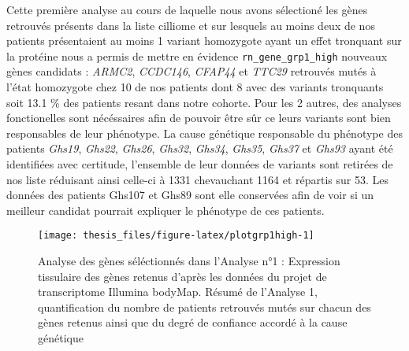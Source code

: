 \documentclass[12pt,twoside]{reedthesis}
\theoremstyle{definition}
\theoremstyle{definition}
\theoremstyle{remark}
\begin{document}
  Cette première analyse au cours de laquelle nous avons sélectioné les
  gènes retrouvés présents dans la liste cilliome et sur lesquels au moins
  deux de nos patients présentaient au moins 1 variant homozygote ayant un
  effet tronquant sur la protéine nous a permis de mettre en évidence
  \texttt{rn\_gene\_grp1\_high} nouveaux gènes candidats : \emph{ARMC2},
  \emph{CCDC146}, \emph{CFAP44} et \emph{TTC29} retrouvés mutés à l'état
  homozygote chez 10 de nos patients dont 8 avec des variants tronquants
  soit 13.1 \% des patients resant dans notre cohorte. Pour les 2 autres,
  des analyses fonctionelles sont nécéssaires afin de pouvoir être sûr ce
  leurs variants sont bien responsables de leur phénotype. La cause
  génétique responsable du phénotype des patients \emph{Ghs19},
  \emph{Ghs22}, \emph{Ghs26}, \emph{Ghs32}, \emph{Ghs34}, \emph{Ghs35},
  \emph{Ghs37} et \emph{Ghs93} ayant été identifiées avec certitude,
  l'ensemble de leur données de variants sont retirées de nos liste
  réduisant ainsi celle-ci à 1331 chevauchant 1164 et répartis sur 53. Les
  données des patients Ghs107 et Ghs89 sont elle conservées afin de voir
  si un meilleur candidat pourrait expliquer le phénotype de ces patients.
  
  \newpage
  
  \begin{figure}
  
  {\centering \texttt{[image: thesis\_files/figure-latex/plotgrp1high-1]} 
  
  }
  
  \caption[Analyse des gènes séléctionnés dans l'Analyse n°1]{Analyse des gènes séléctionnés dans l'Analyse n°1 : Expression tissulaire des gènes retenus d'après les données du projet de transcriptome Illumina bodyMap. Résumé de l'Analyse 1, quantification du nombre de patients retrouvés mutés sur chacun des gènes retenus ainsi que du degré de confiance accordé à la cause génétique}\label{fig:plotgrp1high}
  \end{figure}
  
  \newpage
  
\end{document}
